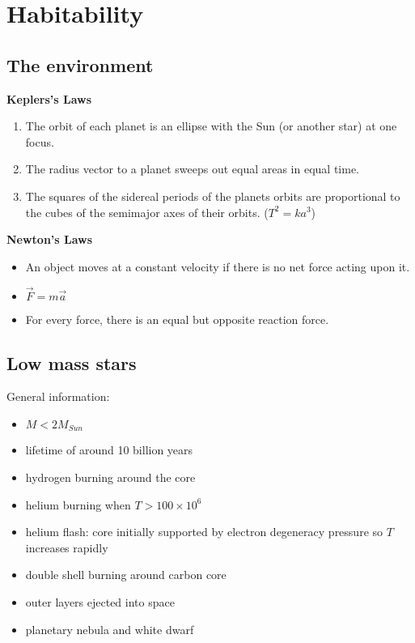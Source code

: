 \documentclass{article}
\theoremstyle{sltheorem}
\begin{document}
\section{Habitability}
\subsection{The environment}
\textbf{Keplers's Laws}
\begin{enumerate}
	\item The orbit of each planet is an ellipse with the Sun (or another star) at one focus.
	\item The radius vector to a planet sweeps out equal areas in equal time.
	\item The squares of the sidereal periods of the planets orbits are proportional to the cubes of the semimajor axes of their orbits. ($T^2=ka^3$)
\end{enumerate}
\textbf{Newton's Laws}
\begin{itemize}
	\item An object moves at a constant velocity if there is no net force acting upon it.
	\item $\vec F = m \vec a$
	\item For every force, there is an equal but opposite reaction force.
\end{itemize}
\subsection{Low mass stars}
General information:
\begin{itemize}
	\item $M < 2M_{Sun}$
	\item lifetime of around 10 billion years
	\item hydrogen burning around the core
	\item helium burning when $T > 100 \times 10^6$
	\item helium flash: core initially supported by electron degeneracy pressure so $T$ increases rapidly
	\item double shell burning around carbon core
	\item outer layers ejected into space
	\item planetary nebula and white dwarf
\end{itemize}
\end{document}
